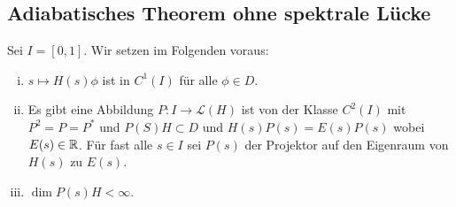 \documentclass{mycourse}
\begin{document}

%

\subsection{Adiabatisches Theorem ohne spektrale Lücke}

\begin{seg}[Annahmen]
Sei $I=[0,1]$. Wir setzen im Folgenden voraus:
\begin{enumerate}[i)]
\item $s\mapsto H(s) \phi$ ist in $C^1(I)$ für alle $\phi \in D$.
\item Es gibt eine Abbildung $P: I \to \mathcal L(H)$ ist von der Klasse $C^2(I)$ mit $P^2= P= P^*$ und $P(S) H \subset D$ und $H(s) P(s)= E(s) P(s)$ wobei $E(s) \in \mathbb{R}$. Für fast alle $s\in I$ sei $P(s)$ der Projektor auf den Eigenraum von $H(s)$ zu $E(s)$.
\item $\dim P(s) H < \infty$.
\end{enumerate}
\end{seg}
\end{document}

